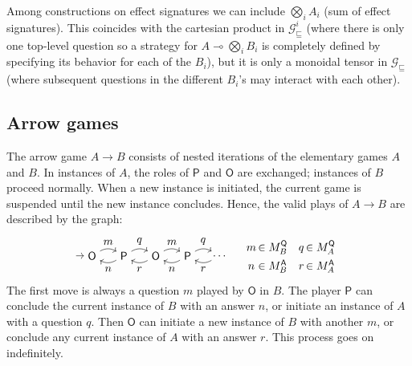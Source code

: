 \documentclass[format=sigplan,authordraft]{acmart}
\newcommand{\gcat}{\mathcal{G}_{\sqsubseteq}}
\newcommand{\kw}[1]{\ensuremath{\mathsf{#1}}}
\begin{document}
Among constructions on effect signatures we can include
$\bigotimes_i A_i$ (sum of effect signatures).
This coincides with the cartesian product in $\gcat^i$
(where there is only one top-level question
so a strategy for $A \multimap \bigotimes_i B_i$
is completely defined
by specifying its behavior for each of the $B_i$),
but it is only a monoidal tensor in $\gcat$
(where subsequent questions in the different $B_i$'s
may interact with each other).

\subsection{Arrow games} %
\label{sec:arrow}

The arrow game $A \rightarrow B$ consists of
nested iterations of the elementary games $A$ and $B$.
In instances of $A$, the roles of $\kw{P}$ and $\kw{O}$ are exchanged;
instances of $B$ proceed normally.
When a new instance is initiated,
the current game is suspended
until the new instance concludes.
Hence,
the valid plays of $A \rightarrow B$
are described by the graph:
\[
  \begin{tikzpicture}[baseline=(O1.base)]
    \node (O1) at (0,0) {\kw{O}};
    \node (P1) at (1,0) {\kw{P}};
    \node (O2) at (2,0) {\kw{O}};
    \node (P2) at (3,0) {\kw{P}};
    \node (O3) at (4,0) {$\ldots$};
    \path [->] (-0.5,0) edge (O1);
    \path [->] (O1) edge[bend left] node[auto] {$m$} (P1);
    \path [->] (P1) edge[bend left] node[auto] {$n$} (O1);
    \path [->] (P1) edge[bend left] node[auto] {$q$} (O2);
    \path [->] (O2) edge[bend left] node[auto] {$r$} (P1);
    \path [->] (O2) edge[bend left] node[auto] {$m$} (P2);
    \path [->] (P2) edge[bend left] node[auto] {$n$} (O2);
    \path [->] (P2) edge[bend left] node[auto] {$q$} (O3);
    \path [->] (O3) edge[bend left] node[auto] {$r$} (P2);
  \end{tikzpicture}
  \quad
  \begin{array}{c@{\,}l@{\quad}c@{\,}l}
    m &\in M_B^\kw{Q} & q &\in M_A^\kw{Q} \\[1ex]
    n &\in M_B^\kw{A} & r &\in M_A^\kw{A}
  \end{array}
\]
The first move is always a question $m$ played by $\kw{O}$ in $B$.
The player $\kw{P}$ can conclude the current instance of $B$
with an answer $n$, or
initiate an instance of $A$
with a question $q$.
Then $\kw{O}$ can initiate a new instance of $B$
with another $m$, or
conclude any current instance of $A$
with an answer $r$.
This process goes on indefinitely.
\end{document}
